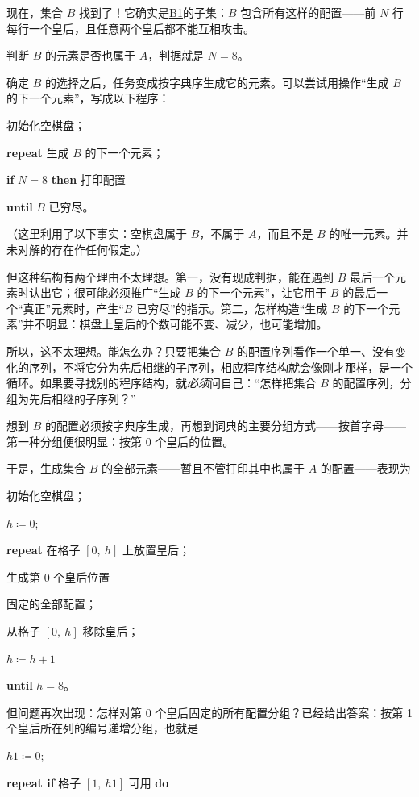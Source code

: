 现在，集合 $B$ 找到了！它确实是\hyperref[en:b1-eight-queens]{B1}的子集：$B$ 包含所有这样的配置——前 $N$ 行每行一个皇后，且任意两个皇后都不能互相攻击。

判断 $B$ 的元素是否也属于 $A$，判据就是 $N = 8$。

确定 $B$ 的选择之后，任务变成按字典序生成它的元素。可以尝试用操作“生成 $B$ 的下一个元素”，写成以下程序：

初始化空棋盘；

\textbf{\textbf{repeat}} 生成 $B$ 的下一个元素；

\quad \textbf{if} $N = 8$ \textbf{then} 打印配置

\textbf{until} $B$ 已穷尽。

\noindent
（这里利用了以下事实：空棋盘属于 $B$，不属于 $A$，而且不是 $B$ 的唯一元素。并未对解的存在作任何假定。）

但这种结构有两个理由不太理想。第一，没有现成判据，能在遇到 $B$ 最后一个元素时认出它；很可能必须推广“生成 $B$ 的下一个元素”，让它用于 $B$ 的最后一个“真正”元素时，产生“$B$ 已穷尽”的指示。第二，怎样构造“生成 $B$ 的下一个元素”并不明显：棋盘上皇后的个数可能不变、减少，也可能增加。

所以，这不太理想。能怎么办？只要把集合 $B$ 的配置序列看作一个单一、没有变化的序列，不将它分为先后相继的子序列，相应程序结构就会像刚才那样，是一个循环。如果要寻找别的程序结构，就\textit{必须}问自己：“怎样把集合 $B$ 的配置序列，分组为先后相继的子序列？”

想到 $B$ 的配置必须按字典序生成，再想到词典的主要分组方式——按首字母——第一种分组便很明显：按第 0 个皇后的位置。

于是，生成集合 $B$ 的全部元素——暂且不管打印其中也属于 $A$ 的配置——表现为

初始化空棋盘；

$h \coloneq 0$;

\textbf{repeat} 在格子 $[0,\ h]$ 上放置皇后；

\quad 生成第 0 个皇后位置

\quad\quad 固定的全部配置；

\quad 从格子 $[0,\ h]$ 移除皇后；

\quad $h \coloneq h + 1$

\textbf{until} $h = 8$。

但问题再次出现：怎样对第 0 个皇后固定的所有配置分组？已经给出答案：按第 1 个皇后所在列的编号递增分组，也就是

$h1 \coloneq 0$;

\textbf{repeat if} 格子 $[1,\ h1]$ 可用 \textbf{do}

